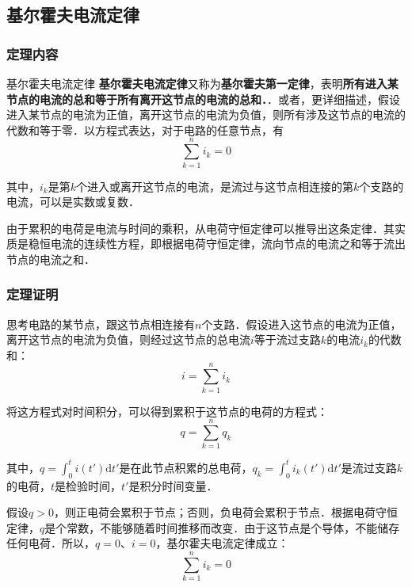 
\subsection{基尔霍夫电流定律}

\subsubsection{定理内容}
\begin{theorem}{基尔霍夫电流定律}
\textbf{基尔霍夫电流定律}又称为\textbf{基尔霍夫第一定律}，表明\textbf{所有进入某节点的电流的总和等于所有离开这节点的电流的总和．}．或者，更详细描述，假设进入某节点的电流为正值，离开这节点的电流为负值，则所有涉及这节点的电流的代数和等于零．以方程式表达，对于电路的任意节点，有
\begin{equation}
\sum_{k=1}^n i_k =0
\end{equation}

其中，$i_k$是第$k$个进入或离开这节点的电流，是流过与这节点相连接的第$k$个支路的电流，可以是实数或复数．
\end{theorem}


由于累积的电荷是电流与时间的乘积，从电荷守恒定律可以推导出这条定律．其实质是稳恒电流的连续性方程，即根据电荷守恒定律，流向节点的电流之和等于流出节点的电流之和．

\subsubsection{定理证明}
思考电路的某节点，跟这节点相连接有$n$个支路．假设进入这节点的电流为正值，离开这节点的电流为负值，则经过这节点的总电流$i$等于流过支路$k$的电流$i_k$的代数和：
\begin{equation}
i=\sum_{k=1}^n i_k
\end{equation}

将这方程式对时间积分，可以得到累积于这节点的电荷的方程式：
\begin{equation}
q=\sum_{k=1}^n q_k
\end{equation}

其中，$\displaystyle q=\int_0^t i(t') \mathrm{d}t'$是在此节点积累的总电荷，$\displaystyle q_k=\int_0^t i_k(t') \mathrm{d}t'$是流过支路$k$的电荷，$t$是检验时间，$t'$是积分时间变量．

假设$q>0$，则正电荷会累积于节点；否则，负电荷会累积于节点．根据电荷守恒定律，$q$是个常数，不能够随着时间推移而改变．由于这节点是个导体，不能储存任何电荷．所以，$q=0$、$i=0$，基尔霍夫电流定律成立：
\begin{equation}
\sum_{k=1}^n i_k =0
\end{equation}

